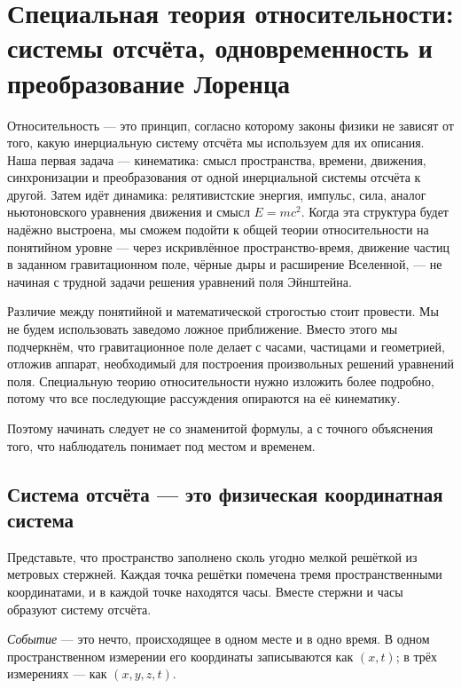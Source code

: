 \chapter{Специальная теория относительности: системы отсчёта, одновременность и преобразование Лоренца}

Относительность — это принцип, согласно которому законы физики не зависят от того, какую инерциальную систему отсчёта мы используем для их описания. Наша первая задача — кинематика: смысл пространства, времени, движения, синхронизации и преобразования от одной инерциальной системы отсчёта к другой. Затем идёт динамика: релятивистские энергия, импульс, сила, аналог ньютоновского уравнения движения и смысл \(E=mc^2\). Когда эта структура будет надёжно выстроена, мы сможем подойти к общей теории относительности на понятийном уровне — через искривлённое пространство-время, движение частиц в заданном гравитационном поле, чёрные дыры и расширение Вселенной, — не начиная с трудной задачи решения уравнений поля Эйнштейна.

Различие между понятийной и математической строгостью стоит провести. Мы не будем использовать заведомо ложное приближение. Вместо этого мы подчеркнём, что гравитационное поле делает с часами, частицами и геометрией, отложив аппарат, необходимый для построения произвольных решений уравнений поля. Специальную теорию относительности нужно изложить более подробно, потому что все последующие рассуждения опираются на её кинематику.

Поэтому начинать следует не со знаменитой формулы, а с точного объяснения того, что наблюдатель понимает под местом и временем.

\section{Система отсчёта — это физическая координатная система}

Представьте, что пространство заполнено сколь угодно мелкой решёткой из метровых стержней. Каждая точка решётки помечена тремя пространственными координатами, и в каждой точке находятся часы. Вместе стержни и часы образуют систему отсчёта.

\begin{definition}
\emph{Событие} — это нечто, происходящее в одном месте и в одно время. В одном пространственном измерении его координаты записываются как \((x,t)\); в трёх измерениях — как \((x,y,z,t)\).
\end{definition}

